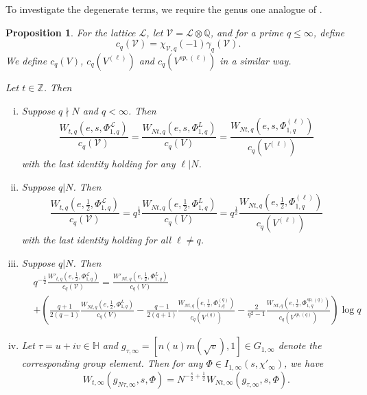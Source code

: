 \documentclass[reqno,oneside]{amsart}
\theoremstyle{plain}
\newtheorem{proposition}[theorem]{Proposition}
\theoremstyle{remark}
\numberwithin{theorem}{section}
\newcommand{\bbQ}{\mathbb Q}
\newcommand{\calL}{\mathcal L}
\newcommand{\calV}{\mathcal V}
\begin{document}
	
	To investigate the  degenerate terms, we require the genus one analogue of .
	
	\begin{proposition}  \label{prop:alt lattice rk 1}
		For the lattice $\calL$, let $\calV = \calL \otimes \bbQ$, and for a prime $q \leq \infty$, define
		\[
		c_q(\calV) = \chi_{\calV, q}(-1) \gamma_q(\calV).
		\]
		We define $c_q(V)$, $c_q(V^{(\ell)})$ and $c_q(V^{sp, (\ell)})$ in a similar way.
		
		Let $t \in \mathbb Z$. Then
		\begin{enumerate}[(i)]
			\item Suppose $q \nmid N$ and $q < \infty$. Then
			\[
			\frac{W_{t,q}(e, s, \Phi^{\calL}_{1,q})}{c_q(\calV)} = 					\frac{W_{Nt,q}(e, s, \Phi^{L}_{1,q})}{c_q(V)} = 					\frac{W_{Nt,q}(e, s, \Phi^{(\ell)}_{1,q})}{c_q(V^{(\ell)})}
			\]
			with the last identity holding for any $\ell | N$.
			\item Suppose $q | N$. Then
			\[
			\frac{	W_{t,q}(e, \frac12, \Phi^{\calL}_{1,q})}{c_q(\calV)} =q^{\frac12} \frac{W_{Nt, q}(e,  \frac12, \Phi^{L}_{1,q})}{c_q(V)}  = q^{\frac12} \frac{W_{Nt, q}(e,  \frac12, \Phi^{(\ell)}_{1,q})}{c_q(V^{(\ell)})}
			\]
			with the last identity holding for all $\ell \neq q$.
			\item Suppose $q|N$. Then
			\begin{align*}
			&q^{-\frac12} 	\frac{	W'_{t,q}(e, \frac12, \Phi^{\calL}_{1,q})}{c_q(\calV)}  =	 \frac{	W'_{Nt,q}(e, \frac12, \Phi^{L}_{1,q})}{c_q(V)} \\
			&  +\left( \frac{q+1}{2(q-1)} 	\frac{	W_{Nt,q}(e, \frac12, \Phi^{L}_{1,q})}{c_q(V)} - \frac{q-1}{2(q+1)} 	\frac{	W_{Nt,q}(e, \frac12, \Phi^{(q)}_{1,q})}{c_q(V^{(q)})}  - \frac{2}{q^2 - 1}   	\frac{	W_{Nt,q}(e, \frac12, \Phi^{sp,(q)}_{1,q})}{c_q(V^{sp,(q)})}\right) \log q
			\end{align*}
			\item Let $\tau = u + iv \in \mathbb H$ and $g_{\tau,\infty} = [n(u) m(\sqrt v), 1] \in G_{1,\infty}$ denote the corresponding group element. Then for any $\Phi \in I_{1, \infty}(s, \chi'_{\infty})$, we have
			\[
			W_{t, \infty}(g_{N\tau, \infty}, s, \Phi) = N^{-\frac{s}2 + \frac12} W_{Nt, \infty}(g_{\tau,\infty}, s, \Phi).
			\]
			

\end{enumerate}
\end{proposition}
\end{document}
